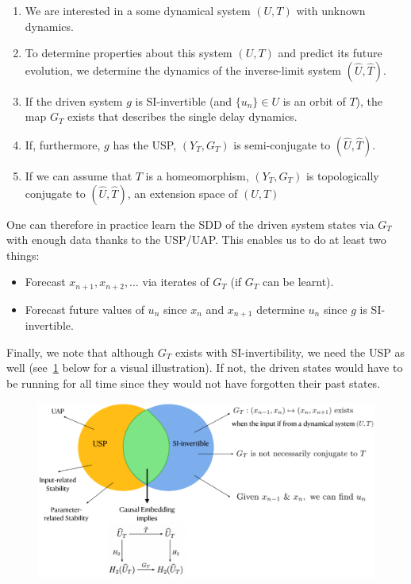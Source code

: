 \vspace{-8mm}
\begin{enumerate}
\item We are interested in a some dynamical system $(U,T)$ with unknown dynamics.
\item To determine properties about this system $(U,T)$ and predict its future evolution, we determine the dynamics of the inverse-limit system $(\widehat{U}, \widehat{T})$.
\item If the driven system $g$ is SI-invertible (and $\{u_n\}\in{U}$  is an orbit of $T$), the map $G_T$ exists that describes the single delay dynamics. 
\item If, furthermore, $g$ has the USP, $(Y_T, G_T)$ is semi-conjugate to $(\widehat{U}, \widehat{T})$.
\item If we can assume that $T$ is a homeomorphism, $(Y_T, G_T)$ is topologically conjugate to $(\widehat{U}, \widehat{T})$, an extension space of $(U,T)$
\end{enumerate} 

One can therefore in practice learn the SDD of the driven system states via $G_T$ with enough data thanks to the USP/UAP. This enables us to do at least two things: 
\vspace{-8mm}
\begin{itemize}
\item Forecast  $x_{n+1},x_{n+2}, \ldots$ via iterates of $G_T$ (if $G_T$ can be learnt).
\item Forecast future values of $u_n$ since $x_n$ and $x_{n+1}$ determine $u_n$ since $g$ is SI-invertible. 
\end{itemize} 


Finally, we note that although $G_T$ exists with SI-invertibility, we need the USP as well (see~\ref{fig:pictorialSummary} below for a visual illustration). 
If not, the driven states would have to be running for all time since they would not have forgotten their past states. 

\begin{figure}[ht]
  \includegraphics[scale=0.3]{Graphs/_summarypictorial.eps}
  \centering
  \label{fig:pictorialSummary}
\end{figure}

